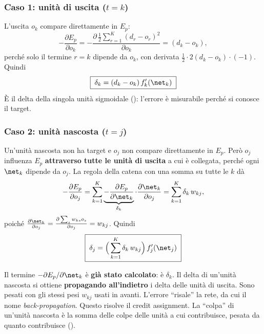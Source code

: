\subsubsection{Caso 1: unità di uscita ($t=k$)}
L'uscita $o_k$ compare direttamente in $E_p$:
\[
-\frac{\partial E_p}{\partial o_k} = -\frac{\partial\,\frac12\sum_{r=1}^{K}(d_r-o_r)^2}{\partial o_k} = (d_k-o_k),
\]
perché solo il termine $r=k$ dipende da $o_k$, con derivata $\frac12\cdot2(d_k-o_k)\cdot(-1)$. Quindi
\begin{equation}\label{eq:delta-uscita}
\boxed{\;\delta_k = (d_k-o_k)\,f'_k(\net_k)\;}
\end{equation}
È il delta della singola unità sigmoidale (): l'errore è misurabile perché si conosce il
target.

\subsubsection{Caso 2: unità nascosta ($t=j$)}
Un'unità nascosta non ha target e $o_j$ non compare direttamente in $E_p$. Però $o_j$ influenza $E_p$
\textbf{attraverso tutte le unità di uscita} a cui è collegata, perché ogni $\net_k$ dipende da $o_j$. La regola
della catena con una somma su tutte le $k$ dà
\[
-\frac{\partial E_p}{\partial o_j} = \sum_{k=1}^{K}\underbrace{-\frac{\partial E_p}{\partial\net_k}}_{\delta_k}\cdot\frac{\partial\net_k}{\partial o_j} = \sum_{k=1}^{K}\delta_k\,w_{kj},
\]
poiché $\frac{\partial\net_k}{\partial o_j} = \frac{\partial\sum_sw_{ks}o_s}{\partial o_j} = w_{kj}$. Quindi
\begin{equation}\label{eq:delta-nascosta}
\boxed{\;\delta_j = \Big(\sum_{k=1}^{K}\delta_k\,w_{kj}\Big)\,f'_j(\net_j)\;}
\end{equation}

\begin{idea}
Il termine $-\partial E_p/\partial\net_k$ è \textbf{già stato calcolato}: è $\delta_k$. Il delta di un'unità
nascosta si ottiene \textbf{propagando all'indietro} i delta delle unità di uscita. Sono pesati con gli stessi
pesi $w_{kj}$ usati in avanti. L'errore ``risale'' la rete, da cui il nome \emph{back-propagation}. Questo
risolve il credit assignment. La ``colpa'' di un'unità nascosta è la somma delle colpe delle unità a cui
contribuisce, pesata da quanto contribuisce ().
\end{idea}

